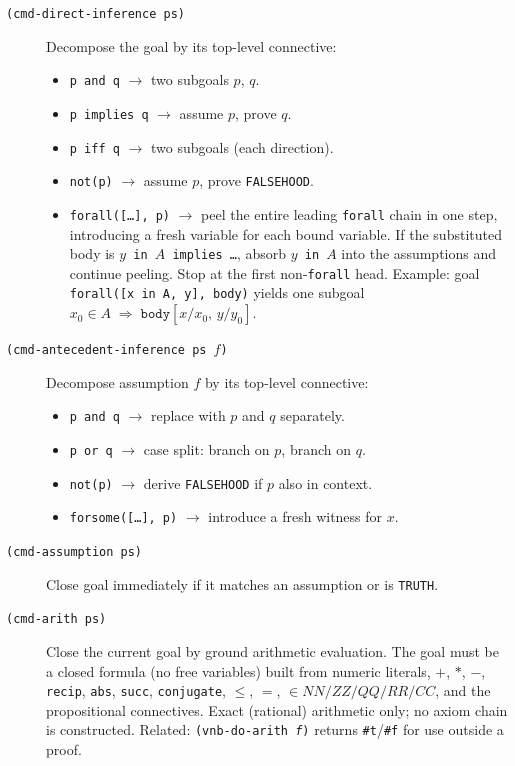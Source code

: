 \documentclass{amsbook}[openany]
\theoremstyle{definition}
\theoremstyle{remark}
\theoremstyle{remark}
\begin{document}
\begin{description}

\item[\texttt{(cmd-direct-inference ps)}]
  Decompose the goal by its top-level connective:
  \begin{itemize}[label=$-$, leftmargin=1cm]
  \item \texttt{p and q} $\to$ two subgoals $p$, $q$.
  \item \texttt{p implies q} $\to$ assume $p$, prove $q$.
  \item \texttt{p iff q} $\to$ two subgoals (each direction).
  \item \texttt{not(p)} $\to$ assume $p$, prove \texttt{FALSEHOOD}.
  \item \texttt{forall([\ldots], p)} $\to$ peel the entire leading
    \texttt{forall} chain in one step, introducing a fresh variable for
    each bound variable.  If the substituted body is
    \texttt{$y$ in $A$ implies \ldots}, absorb \texttt{$y$ in $A$} into
    the assumptions and continue peeling.  Stop at the first
    non-\texttt{forall} head.
    Example: goal \texttt{forall([x in A, y], body)} yields one subgoal
    $x_0 \in A \;\Longrightarrow\; \texttt{body}[x/x_0,\,y/y_0]$.
  \end{itemize}

\item[\texttt{(cmd-antecedent-inference ps $f$)}]
  Decompose assumption $f$ by its top-level connective:
  \begin{itemize}[label=$-$, leftmargin=1cm]
  \item \texttt{p and q} $\to$ replace with $p$ and $q$ separately.
  \item \texttt{p or q} $\to$ case split: branch on $p$, branch on $q$.
  \item \texttt{not(p)} $\to$ derive \texttt{FALSEHOOD} if $p$ also in context.
  \item \texttt{forsome([\ldots], p)} $\to$ introduce a fresh witness for $x$.
  \end{itemize}

\item[\texttt{(cmd-assumption ps)}]
  Close goal immediately if it matches an assumption or is \texttt{TRUTH}.

\item[\texttt{(cmd-arith ps)}]
  Close the current goal by ground arithmetic evaluation.  The goal must
  be a closed formula (no free variables) built from numeric literals,
  $+$, $*$, $-$, \texttt{recip}, \texttt{abs}, \texttt{succ},
  \texttt{conjugate}, $\leq$, $=$,
  $\in \mathit{NN}/\mathit{ZZ}/\mathit{QQ}/\mathit{RR}/\mathit{CC}$,
  and the propositional connectives.  Exact (rational) arithmetic only;
  no axiom chain is constructed.
  Related: \texttt{(vnb-do-arith \textit{f})} returns \texttt{\#t}/\texttt{\#f}
  for use outside a proof.


\end{description}
\end{document}
